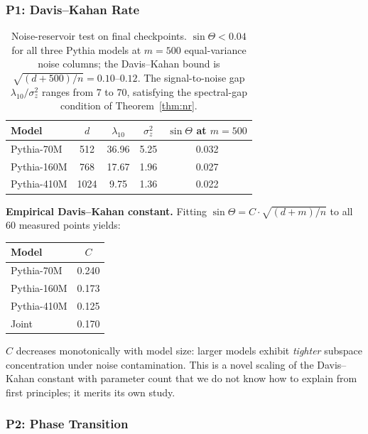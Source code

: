 \subsubsection{P1: Davis--Kahan Rate}

\begin{table}[H]
\centering\small
\begin{tabular}{lSSSS}
\toprule
Model & {$d$} & {$\lambda_{10}$} & {$\sigma_z^2$} &
        {$\sin\Theta$ at $m{=}500$} \\
\midrule
Pythia-70M  & 512 & 36.96 & 5.25 & 0.032 \\
Pythia-160M & 768 & 17.67 & 1.96 & 0.027 \\
Pythia-410M & 1024 & 9.75 & 1.36 & 0.022 \\
\bottomrule
\end{tabular}
\caption{Noise-reservoir test on final checkpoints.
$\sin\Theta < 0.04$ for all three Pythia models at $m = 500$ equal-variance
noise columns; the Davis--Kahan bound is $\sqrt{(d+500)/n} = 0.10$--$0.12$.
The signal-to-noise gap $\lambda_{10}/\sigma_z^2$ ranges from 7 to 70,
satisfying the spectral-gap condition of Theorem~\ref{thm:nr}.}
\label{tab:nr-final}
\end{table}

\textbf{Empirical Davis--Kahan constant.}
Fitting $\sin\Theta = C \cdot \sqrt{(d+m)/n}$ to all 60 measured points
yields:
\begin{center}
\begin{tabular}{lS}
\toprule
Model & {$C$} \\
\midrule
Pythia-70M & 0.240 \\
Pythia-160M & 0.173 \\
Pythia-410M & 0.125 \\
\midrule
Joint & 0.170 \\
\bottomrule
\end{tabular}
\end{center}
$C$ decreases monotonically with model size: larger models exhibit
\emph{tighter} subspace concentration under noise contamination.
This is a novel scaling of the Davis--Kahan constant with parameter count
that we do not know how to explain from first principles; it merits its
own study.

\subsubsection{P2: Phase Transition}

